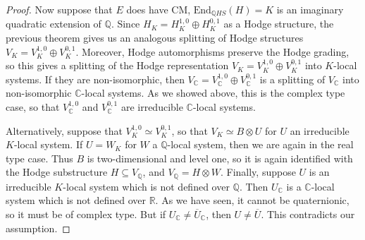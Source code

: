 \documentclass[10pt,a4paper]{amsart}
\newcommand{\C}{\mathbb{C}}
\newcommand{\End}{\text{End}}
\newcommand{\Q}{\mathbb{Q}}
\newcommand{\R}{\mathbb{R}}
\begin{document}
\begin{proof}
Now suppose that \(E\) does have CM, \(\End_{\Q HS}(H) = K\) is an imaginary 
quadratic extension of \(\Q\). Since \(H_K = H_K^{1,0} \oplus H_K^{0,1}\) as a 
Hodge structure, the previous theorem gives us an analogous splitting of 
Hodge structures \(V_K = V_K^{1,0} \oplus V_K^{0,1}\). Moreover, Hodge automorphisms 
preserve the Hodge grading, so this gives a splitting of the Hodge representation 
\(V_K = V_K^{1,0} \oplus V_K^{0,1}\) into \(K\)-local systems. If they are 
non-isomorphic, then \(V_\C = V_\C^{1,0} \oplus V_\C^{0,1}\) is a splitting of 
\(V_\C\) into non-isomorphic \(\C\)-local systems. As we showed above, 
this is the complex type case, so that \(V_\C^{1,0}\) and \(V_\C^{0,1}\) are 
irreducible \(\C\)-local systems. 

Alternatively, suppose that \(V_K^{1,0} \simeq V_K^{0,1}\), so that 
\(V_K \simeq B \otimes U\) for \(U\) an irreducible \(K\)-local system.
If \(U = W_K\) for \(W\) a \(\Q\)-local system, then we are again in the real type
case. Thus \(B\) is two-dimensional and level one, so it is again identified 
with the Hodge substructure \(H \subseteq V_\Q\), and \(V_\Q = H \otimes W\).
Finally, suppose \(U\) is an irreducible \(K\)-local system which is not defined
over \(\Q\). Then \(U_\C\) is a \(\C\)-local system which is not defined 
over \(\R\). As we have seen, it cannot be quaternionic, so it must be of 
complex type. But if \(U_\C \neq \overline{U}_\C\), then \(U \neq \overline{U}\).
This contradicts our assumption.
\end{proof}
\end{document}

